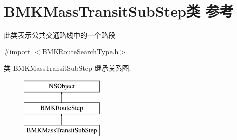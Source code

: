 \hypertarget{interface_b_m_k_mass_transit_sub_step}{}\section{B\+M\+K\+Mass\+Transit\+Sub\+Step类 参考}
\label{interface_b_m_k_mass_transit_sub_step}


此类表示公共交通路线中的一个路段  




{\ttfamily \#import $<$B\+M\+K\+Route\+Search\+Type.\+h$>$}

类 B\+M\+K\+Mass\+Transit\+Sub\+Step 继承关系图\+:\begin{figure}[H]
\begin{center}
\leavevmode
\includegraphics[height=3.000000cm]{interface_b_m_k_mass_transit_sub_step}
\end{center}
\end{figure}
